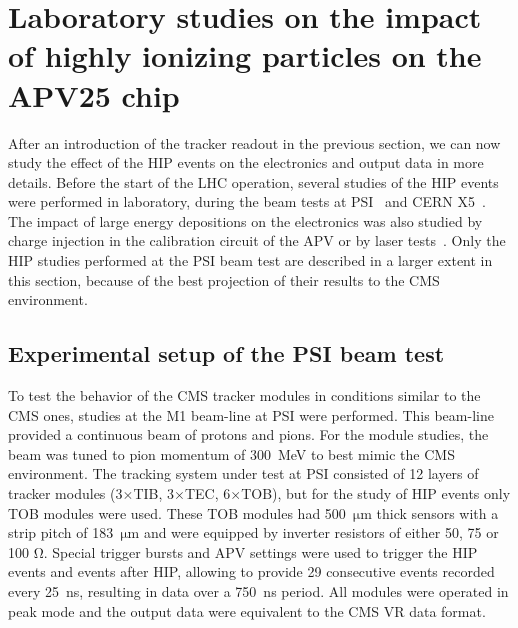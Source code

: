 
\section{Laboratory studies on the impact of highly ionizing particles on the APV25 chip~\label{sec:HIPinPast}}


After an introduction of the tracker readout in the previous section, we can now study the effect of the HIP events on the electronics and output data in more details. Before the start of the LHC operation, several studies of the HIP events were performed in laboratory, during the beam tests at PSI~\cite{Tomalin:2003aaa} and CERN X5~\cite{Bainbridge:2002bda}. The impact of large energy depositions on the electronics was also studied by charge injection in the calibration circuit of the APV or by laser tests~\cite{Adam:2005pz}. Only the HIP studies performed at the PSI beam test are described in a larger extent in this section, because of the best projection of their results to the CMS environment.

\subsection{Experimental setup of the PSI beam test}

To test the behavior of the CMS tracker modules in conditions similar to the CMS ones, studies at the M1 beam-line at PSI were performed. This beam-line provided a continuous beam of protons and pions. For the module studies, the beam was tuned to pion momentum of 300~MeV to best mimic the CMS environment. The tracking system under test at PSI consisted of 12 layers of tracker modules (3$\times$TIB, 3$\times$TEC, 6$\times$TOB), but for the study of HIP events only TOB modules were used. These TOB modules had 500~$\mathrm{\mu m}$ thick sensors with a strip pitch of 183~$\mathrm{\mu}$m and were equipped by inverter resistors of either 50, 75 or 100 $\mathrm{\Omega}$. Special trigger bursts and APV settings were used to trigger the HIP events and events after HIP, allowing to provide 29 consecutive events recorded every 25~ns, resulting in data over a 750~ns period. All modules were operated in peak mode and the output data were equivalent to the CMS VR data format. 


